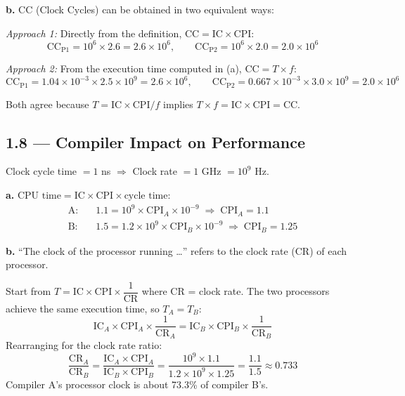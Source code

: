 \medskip\noindent\textbf{b.} CC (Clock Cycles) can be obtained in two equivalent ways:

\noindent\textit{Approach 1:} Directly from the definition,
$\text{CC} = \text{IC} \times \text{CPI}$:
\[
  \text{CC}_{\text{P1}} = 10^6 \times 2.6 = 2.6 \times 10^6, \qquad
  \text{CC}_{\text{P2}} = 10^6 \times 2.0 = 2.0 \times 10^6
\]

\noindent\textit{Approach 2:} From the execution time computed in (a),
$\text{CC} = T \times f$:
\[
  \text{CC}_{\text{P1}} = 1.04 \times 10^{-3} \times 2.5 \times 10^9 = 2.6 \times 10^6, \qquad
  \text{CC}_{\text{P2}} = 0.667 \times 10^{-3} \times 3.0 \times 10^9 = 2.0 \times 10^6
\]

\noindent Both agree because
$T = \text{IC} \times \text{CPI} / f$ implies
$T \times f = \text{IC} \times \text{CPI} = \text{CC}$.

\subsection*{1.8 --- Compiler Impact on Performance}
\hypertarget{sol-1.8}{}

Clock cycle time $= 1$ ns $\Rightarrow$ Clock rate $= 1$ GHz $= 10^9$ Hz.

\medskip\noindent\textbf{a.} $\text{CPU time} = \text{IC} \times \text{CPI}
\times \text{cycle time}$:
\begin{align*}
  \text{A}: &\quad 1.1 = 10^9 \times \text{CPI}_A \times 10^{-9}
    \;\Rightarrow\; \text{CPI}_A = 1.1 \\
  \text{B}: &\quad 1.5 = 1.2 \times 10^9 \times \text{CPI}_B \times 10^{-9}
    \;\Rightarrow\; \text{CPI}_B = 1.25
\end{align*}

\noindent\textbf{b.} ``The clock of the processor running \ldots'' refers to
the clock rate (CR) of each processor.

\smallskip\noindent Start from
$T = \text{IC} \times \text{CPI} \times \dfrac{1}{\text{CR}}$
where CR = clock rate.
The two processors achieve the same execution time, so $T_A = T_B$:
\[
  \text{IC}_A \times \text{CPI}_A \times \frac{1}{\text{CR}_A}
  = \text{IC}_B \times \text{CPI}_B \times \frac{1}{\text{CR}_B}
\]
Rearranging for the clock rate ratio:
\[
  \frac{\text{CR}_A}{\text{CR}_B}
  = \frac{\text{IC}_A \times \text{CPI}_A}{\text{IC}_B \times \text{CPI}_B}
  = \frac{10^9 \times 1.1}{1.2 \times 10^9 \times 1.25}
  = \frac{1.1}{1.5} \approx 0.733
\]
Compiler A's processor clock is about 73.3\% of compiler B's.

